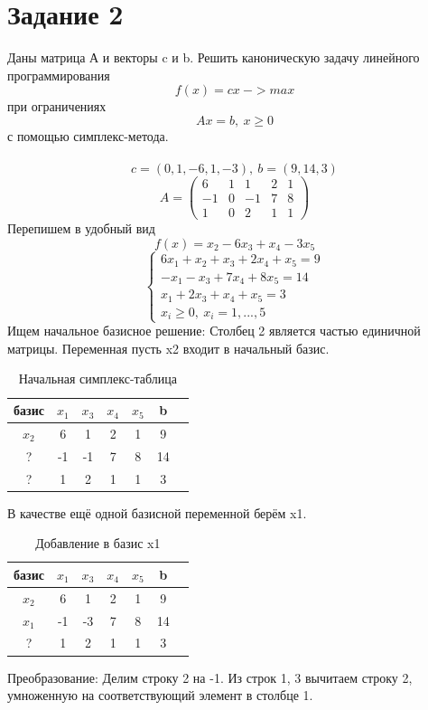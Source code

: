 \documentclass{article}
\begin{document}
\section*{Задание 2}
Даны матрица А и векторы c и b. Решить каноническую задачу линейного программирования
\[f(x) = cx \ -> max\]
при ограничениях
\[Ax = b,\ x\geq 0\]
с помощью симплекс-метода.
\\ \\
\[c = (0, 1, -6, 1, -3),\ b = (9, 14, 3)\]
\[A = \begin{pmatrix}
    6&1&1&2&1\\
    -1&0&-1&7&8\\
    1&0&2&1&1
\end{pmatrix}\]
Перепишем в удобный вид
\[f(x) = x_2-6x_3+x_4-3x_5\]
\[\begin{cases}
    6x_1+x_2+x_3+2x_4+x_5 = 9\\
    -x_1-x_3+7x_4+8x_5 = 14\\
    x_1+2x_3+x_4+x_5 = 3\\
    x_i \geq 0,\ x_i = 1, ..., 5
\end{cases}\]
Ищем начальное базисное решение:
Столбец 2 является частью единичной матрицы. Переменная пусть x2 входит в начальный базис.
\begin{table}[H]
    \centering
    \caption{Начальная симплекс-таблица}
    \begin{tabular}{|c|c|c|c|c|c|c|}
    \hline
        базис & $x_1$ & $x_3$ & $x_4$ & $x_5$ & b \\ \hline
        $x_2$ & 6 & 1 & 2 & 1 & 9 \\
        ? & -1 & -1 & 7 & 8 & 14 \\
        ? & 1 & 2 & 1 & 1 & 3 \\ \hline
    \end{tabular}
\end{table}
В качестве ещё одной базисной переменной берём x1. 

\begin{table}[H]
    \centering
    \caption{Добавление в базис x1}
    \begin{tabular}{|c|c|c|c|c|c|c|}
    \hline
        базис & $x_1$ & $x_3$ & $x_4$ & $x_5$ & b \\ \hline
        $x_2$ & 6	&1	&2	&1&	9 \\
        $x_1$ & -1&	-3&	7	&8&	14 \\
        ? & 1	&2	&1&	1&	3 \\ \hline
    \end{tabular}
\end{table}
Преобразование: Делим строку 2 на -1. Из строк 1, 3 вычитаем строку 2, умноженную на соответствующий элемент в столбце 1.
\end{document}
